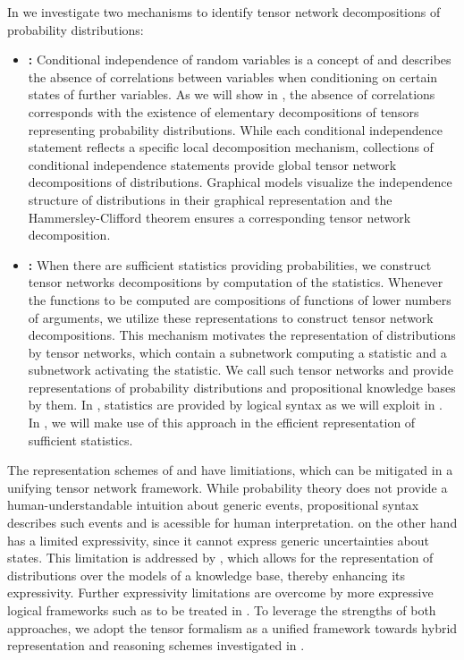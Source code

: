 In  we investigate two mechanisms to identify tensor network decompositions of probability distributions:
\begin{itemize}
    \item \textbf{\IndependenceMechanism{}:}
    Conditional independence of random variables is a concept of \probabilityTheory{} and describes the absence of correlations between variables when conditioning on certain states of further variables.
    As we will show in , the absence of correlations corresponds with the existence of elementary decompositions of tensors representing probability distributions.
    While each conditional independence statement reflects a specific local decomposition mechanism, collections of conditional independence statements provide global tensor network decompositions of distributions.
    Graphical models visualize the independence structure of distributions in their graphical representation and the Hammersley-Clifford theorem ensures a corresponding tensor network decomposition.
    \item \textbf{\ComputationMechanism{}:}
    When there are sufficient statistics providing probabilities, we construct tensor networks decompositions by computation of the statistics.
    Whenever the functions to be computed are compositions of functions of lower numbers of arguments, we utilize these representations to construct tensor network decompositions.
    This mechanism motivates the representation of distributions by tensor networks, which contain a subnetwork computing a statistic and a subnetwork activating the statistic.
    We call such tensor networks \ComputationActivationNetworks{} and provide representations of probability distributions and propositional knowledge bases by them.
    In \propositionalLogic{}, statistics are provided by logical syntax as we will exploit in .
    In \probabilityTheory{}, we will make use of this approach in the efficient representation of sufficient statistics.
\end{itemize}
The representation schemes of \probabilityTheory{} and \propositionalLogic{} have limitiations, which can be mitigated in a unifying tensor network framework.
While probability theory does not provide a human-understandable intuition about generic events, propositional syntax describes such events and is acessible for human interpretation.
\PropositionalLogic{} on the other hand has a limited expressivity, since it cannot express generic uncertainties about states.
This limitation is addressed by \probabilityTheory{}, which allows for the representation of distributions over the models of a knowledge base, thereby enhancing its expressivity.
Further expressivity limitations are overcome by more expressive logical frameworks such as \firstOrderLogic{} to be treated in .
To leverage the strengths of both approaches, we adopt the tensor formalism as a unified framework towards hybrid representation and reasoning schemes investigated in .

